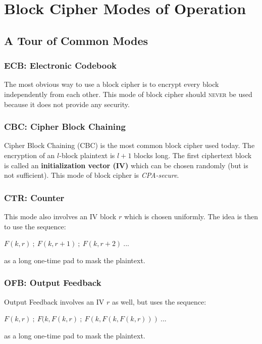 \documentclass{article}
\begin{document}
		\section{Block Cipher Modes of Operation}
		\begin{adjustwidth}{2em}{2em}
			\subsection{A Tour of Common Modes}
			\begin{adjustwidth}{2em}{2em}
				\subsubsection{ECB: Electronic Codebook}
				\begin{adjustwidth}{2em}{1em}
					The most obvious way to use a block cipher is to encrypt every block independently from each other. This mode of block cipher should \textsc{never} be used because it does not provide any security.
				\end{adjustwidth}
				\subsubsection{CBC: Cipher Block Chaining}
				\begin{adjustwidth}{2em}{1em}
					Cipher Block Chaining (CBC) is the most common block cipher used today. The encryption of an $l$-block plaintext is $l+1$ blocks long. The first ciphertext block is called  an \textbf{initialization vector (IV)} which can be chosen randomly (but is not sufficient). This mode of block cipher is \textit{CPA-secure}.
				\end{adjustwidth}
				\subsubsection{CTR: Counter}
				\begin{adjustwidth}{2em}{1em}
					This mode also involves an IV block $r$ which is chosen uniformly. The idea is then to use the sequence:
					\begin{center}
						$F(k,r) \ ; \ F(k,r+1) \ ; \ F(k,r+2) \ ...$
					\end{center}
					as a long one-time pad to mask the plaintext.
				\end{adjustwidth}
				\subsubsection{OFB: Output Feedback}
				\begin{adjustwidth}{2em}{1em}
					Output Feedback involves an IV $r$ as well, but uses the sequence:
					\begin{center}
						$F(k,r) \ ; \ F(k,F(k,r) \ ; \ F(k,F(k,F(k,r))) \ ...$
					\end{center}
					as a long one-time pad to mask the plaintext.
				\end{adjustwidth}

\end{adjustwidth}
\end{adjustwidth}
\end{document}
